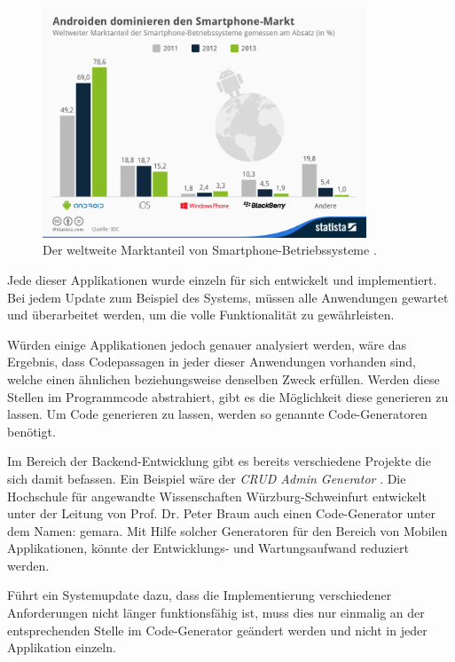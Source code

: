 \begin{figure}[H]
	\begin{center}
		\includegraphics[width=0.86\textwidth]{images/os.jpg}
		\caption{Der weltweite Marktanteil von Smartphone-Betriebssysteme \cite{os}.}
		\label{fig:os_fig}
	\end{center}
\end{figure}

Jede dieser Applikationen wurde einzeln für sich entwickelt und implementiert. Bei jedem Update zum Beispiel des Systems, müssen alle Anwendungen gewartet und überarbeitet werden, um die volle Funktionalität zu gewährleisten.

Würden einige Applikationen jedoch genauer analysiert werden, wäre das Ergebnis, dass Codepassagen in jeder dieser Anwendungen vorhanden sind, welche einen ähnlichen beziehungsweise denselben Zweck erfüllen. Werden diese Stellen im Programmcode abstrahiert, gibt es die Möglichkeit diese generieren zu lassen. Um Code generieren zu lassen, werden so genannte Code-Generatoren benötigt. 

Im Bereich der Backend-Entwicklung gibt es bereits verschiedene Projekte die sich damit befassen. Ein Beispiel wäre der \textit{CRUD Admin Generator} \cite{generators}. Die Hochschule für angewandte Wissenschaften Würzburg-Schweinfurt entwickelt  unter der Leitung von Prof. Dr. Peter Braun auch einen Code-Generator unter dem Namen: \ac{gemara}. Mit Hilfe solcher Generatoren für den Bereich von Mobilen Applikationen, könnte der Entwicklungs- und Wartungsaufwand reduziert werden. 

Führt ein Systemupdate dazu, dass die Implementierung verschiedener Anforderungen nicht länger funktionsfähig ist, muss dies nur einmalig an der entsprechenden Stelle im Code-Generator geändert werden und nicht in jeder Applikation einzeln. 

